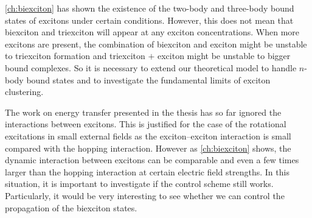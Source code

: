 



\autoref{ch:biexciton} has shown the existence of  the two-body and three-body bound states of excitons under certain 
conditions. However, this does not mean that biexciton and triexciton will appear at any exciton concentrations. 
When more excitons are present, the combination of biexciton and exciton might be unstable to triexciton formation
 and triexciton $+$ exciton might be unstable to bigger bound complexes.  So it is necessary to extend our theoretical
model to handle $n$-body bound states and to investigate the fundamental limits of exciton clustering. 


The work on energy transfer presented in the thesis has so far ignored the interactions between excitons. This is justified for the case of the rotational 
excitations in small external fields as the exciton--exciton interaction is small compared with the hopping interaction. 
However as \autoref{ch:biexciton} shows, the dynamic interaction between excitons can be comparable and even a few 
times larger than the hopping interaction at certain electric field strengths. In this situation, it is important to investigate
 if the control scheme still works. Particularly, it would be very interesting to see whether we can control the propagation
 of the biexciton states. 
 
 

